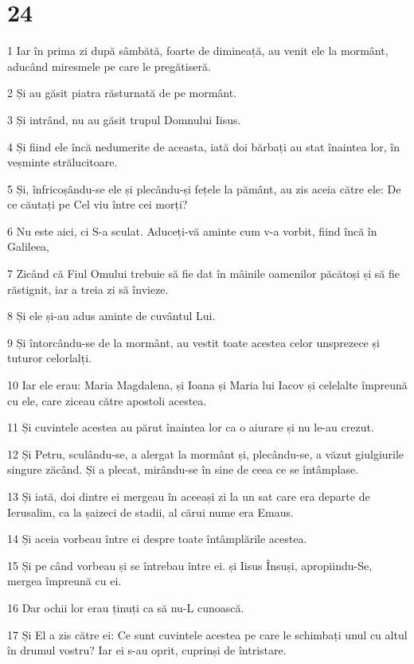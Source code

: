 \chapter{24}

\par 1 Iar în prima zi după sâmbătă, foarte de dimineață, au venit ele la mormânt, aducând miresmele pe care le pregătiseră.
\par 2 Și au găsit piatra răsturnată de pe mormânt.
\par 3 Și intrând, nu au găsit trupul Domnului Iisus.
\par 4 Și fiind ele încă nedumerite de aceasta, iată doi bărbați au stat înaintea lor, în veșminte strălucitoare.
\par 5 Și, înfricoșându-se ele și plecându-și fețele la pământ, au zis aceia către ele: De ce căutați pe Cel viu între cei morți?
\par 6 Nu este aici, ci S-a sculat. Aduceți-vă aminte cum v-a vorbit, fiind încă în Galileea,
\par 7 Zicând că Fiul Omului trebuie să fie dat în mâinile oamenilor păcătoși și să fie răstignit, iar a treia zi să învieze.
\par 8 Și ele și-au adus aminte de cuvântul Lui.
\par 9 Și întorcându-se de la mormânt, au vestit toate acestea celor unsprezece și tuturor celorlalți.
\par 10 Iar ele erau: Maria Magdalena, și Ioana și Maria lui Iacov și celelalte împreună cu ele, care ziceau către apostoli acestea.
\par 11 Și cuvintele acestea au părut înaintea lor ca o aiurare și nu le-au crezut.
\par 12 Și Petru, sculându-se, a alergat la mormânt și, plecându-se, a văzut giulgiurile singure zăcând. Și a plecat, mirându-se în sine de ceea ce se întâmplase.
\par 13 Și iată, doi dintre ei mergeau în aceeași zi la un sat care era departe de Ierusalim, ca la șaizeci de stadii, al cărui nume era Emaus.
\par 14 Și aceia vorbeau între ei despre toate întâmplările acestea.
\par 15 Și pe când vorbeau și se întrebau între ei. și Iisus Însuși, apropiindu-Se, mergea împreună cu ei.
\par 16 Dar ochii lor erau ținuți ca să nu-L cunoască.
\par 17 Și El a zis către ei: Ce sunt cuvintele acestea pe care le schimbați unul cu altul în drumul vostru? Iar ei s-au oprit, cuprinși de întristare.
